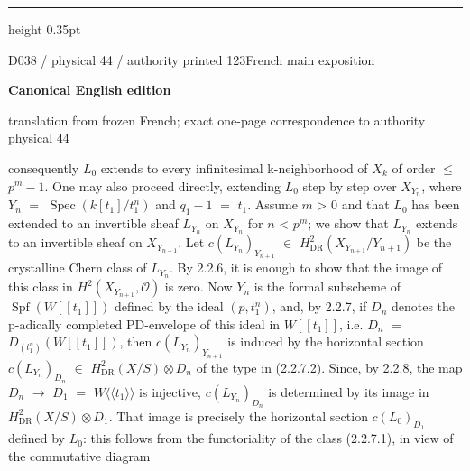 \documentclass[9pt]{article}
\newcommand{\CanonText}[1]{\par{\fontsize{8.0}{9.35}\selectfont\RaggedRight #1\par}\vspace{2.2pt}}
\newcommand{\LayerTitle}{Canonical English edition}
\begin{document}
\begin{minipage}[t][\dimexpr\textheight-5pt\relax][t]{\textwidth}
\vfill
{\color{Accent}\hrule height 0.35pt}\vspace{3pt}
\end{minipage}
\newpage
\noindent\begin{minipage}[t][\dimexpr\textheight-5pt\relax][t]{\textwidth}
{\sffamily\fontsize{7.3}{8.2}\selectfont\color{Quiet} D038 / physical 44 / authority printed 123\hfill French main exposition}
\par{}\vspace{4.5pt}
{\sffamily\fontsize{10.4}{11.6}\selectfont\bfseries\color{Accent} \LayerTitle}
\par{\sffamily\fontsize{6.7}{7.7}\selectfont\color{Quiet} translation from frozen French; exact one-page correspondence to authority physical 44}
\vspace{5pt}
\CanonText{consequently \(L_{0}\) extends to every infinitesimal k-neighborhood of \(X_{k}\) of order \(\leq{}\) \(p^{m}-1\). One may also proceed directly, extending \(L_{0}\) step by step over \(X_{Y_{n}}\), where \(Y_{n}\) \(=\) \(\operatorname{Spec}(k[t_{1}]/t_{1}^{n})\) and \(q_{1}-1\) \(=\) \(t_{1}\). Assume \(m\) > 0 and that \(L_{0}\) has been extended to an invertible sheaf \(L_{Y_{n}}\) on \(X_{Y_{n}}\) for \(n\) < \(p^{m}\); we show that \(L_{Y_{n}}\) extends to an invertible sheaf on \(X_{Y_{n+1}}\). Let \(c(L_{Y_{n}})_{Y_{n+1}}\) \(\in{}\) \(H^{2}_{\mathrm{DR}}(X_{Y_{n+1}}/Y_{n+1})\) be the crystalline Chern class of \(L_{Y_{n}}\). By 2.2.6, it is enough to show that the image of this class in \(H^{2}(X_{Y_{n+1}},\mathcal{O})\) is zero. Now \(Y_{n}\) is the formal subscheme of \(\operatorname{Spf}(W[[t_{1}]])\) defined by the ideal \((p,t_{1}^{n})\), and, by 2.2.7, if \(D_{n}\) denotes the p-adically completed PD-envelope of this ideal in \(W[[t_{1}]]\), i.e. \(D_{n}\) \(=\) \(D_{(t_{1}^{n})}(W[[t_{1}]])\), then \(c(L_{Y_{n}})_{Y_{n+1}}\) is induced by the horizontal section \(c(L_{Y_{n}})_{D_{n}}\) \(\in{}\) \(H^{2}_{\mathrm{DR}}(X/S)\otimes{}D_{n}\) of the type in (2.2.7.2). Since, by 2.2.8, the map \(D_{n}\) \(\to{}\) \(D_{1}\) \(=\) \(W\langle{}\langle{}t_{1}\rangle{}\rangle{}\) is injective, \(c(L_{Y_{n}})_{D_{n}}\) is determined by its image in \(H^{2}_{\mathrm{DR}}(X/S)\otimes{}D_{1}\). That image is precisely the horizontal section \(c(L_{0})_{D_{1}}\) defined by \(L_{0}\): this follows from the functoriality of the class (2.2.7.1), in view of the commutative diagram}

\end{minipage}
\end{document}
